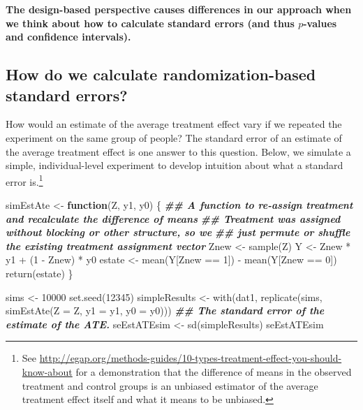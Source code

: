\documentclass[
  12pt,
]{book}
\newenvironment{Shaded}{\begin{snugshade}}{\end{snugshade}}
\newcommand{\AttributeTok}[1]{\textcolor[rgb]{0.77,0.63,0.00}{#1}}
\newcommand{\ControlFlowTok}[1]{\textcolor[rgb]{0.13,0.29,0.53}{\textbf{#1}}}
\newcommand{\DecValTok}[1]{\textcolor[rgb]{0.00,0.00,0.81}{#1}}
\newcommand{\DocumentationTok}[1]{\textcolor[rgb]{0.56,0.35,0.01}{\textbf{\textit{#1}}}}
\newcommand{\FunctionTok}[1]{\textcolor[rgb]{0.00,0.00,0.00}{#1}}
\newcommand{\NormalTok}[1]{#1}
\newcommand{\OtherTok}[1]{\textcolor[rgb]{0.56,0.35,0.01}{#1}}
\newcommand{\SpecialCharTok}[1]{\textcolor[rgb]{0.00,0.00,0.00}{#1}}
\theoremstyle{definition}
\theoremstyle{definition}
\theoremstyle{definition}
\theoremstyle{remark}
\begin{document}
\textbf{The design-based perspective causes differences in our approach
when we think about how to calculate standard errors (and thus
\(p\)-values and confidence intervals).}

\hypertarget{how-do-we-calculate-randomization-based-standard-errors}{%
\subsection{How do we calculate randomization-based standard
errors?}\label{how-do-we-calculate-randomization-based-standard-errors}}

How would an estimate of the average treatment effect vary if we
repeated the experiment on the same group of people? The standard error
of an estimate of the average treatment effect is one answer to this
question. Below, we simulate a simple, individual-level experiment to
develop intuition about what a standard error is.\footnote{See
  \url{http://egap.org/methods-guides/10-types-treatment-effect-you-should-know-about}
  for a demonstration that the difference of means in the observed
  treatment and control groups is an unbiased estimator of the average
  treatment effect itself and what it means to be unbiased.}

\begin{Shaded}
\begin{Highlighting}[]
\NormalTok{simEstAte }\OtherTok{\textless{}{-}} \ControlFlowTok{function}\NormalTok{(Z, y1, y0) \{}
  \DocumentationTok{\#\# A function to re{-}assign treatment and recalculate the difference of means}
  \DocumentationTok{\#\# Treatment was assigned without blocking or other structure, so we}
  \DocumentationTok{\#\# just permute or shuffle the existing treatment assignment vector}
\NormalTok{  Znew }\OtherTok{\textless{}{-}} \FunctionTok{sample}\NormalTok{(Z)}
\NormalTok{  Y }\OtherTok{\textless{}{-}}\NormalTok{ Znew }\SpecialCharTok{*}\NormalTok{ y1 }\SpecialCharTok{+}\NormalTok{ (}\DecValTok{1} \SpecialCharTok{{-}}\NormalTok{ Znew) }\SpecialCharTok{*}\NormalTok{ y0}
\NormalTok{  estate }\OtherTok{\textless{}{-}} \FunctionTok{mean}\NormalTok{(Y[Znew }\SpecialCharTok{==} \DecValTok{1}\NormalTok{]) }\SpecialCharTok{{-}} \FunctionTok{mean}\NormalTok{(Y[Znew }\SpecialCharTok{==} \DecValTok{0}\NormalTok{])}
  \FunctionTok{return}\NormalTok{(estate)}
\NormalTok{\}}
\end{Highlighting}
\end{Shaded}

\begin{Shaded}
\begin{Highlighting}[]
\NormalTok{sims }\OtherTok{\textless{}{-}} \DecValTok{10000}
\FunctionTok{set.seed}\NormalTok{(}\DecValTok{12345}\NormalTok{)}
\NormalTok{simpleResults }\OtherTok{\textless{}{-}} \FunctionTok{with}\NormalTok{(dat1, }\FunctionTok{replicate}\NormalTok{(sims, }\FunctionTok{simEstAte}\NormalTok{(}\AttributeTok{Z =}\NormalTok{ Z, }\AttributeTok{y1 =}\NormalTok{ y1, }\AttributeTok{y0 =}\NormalTok{ y0)))}
\DocumentationTok{\#\# The standard error of the estimate of the ATE.}
\NormalTok{seEstATEsim }\OtherTok{\textless{}{-}} \FunctionTok{sd}\NormalTok{(simpleResults)}
\NormalTok{seEstATEsim}
\end{Highlighting}
\end{Shaded}
\end{document}
